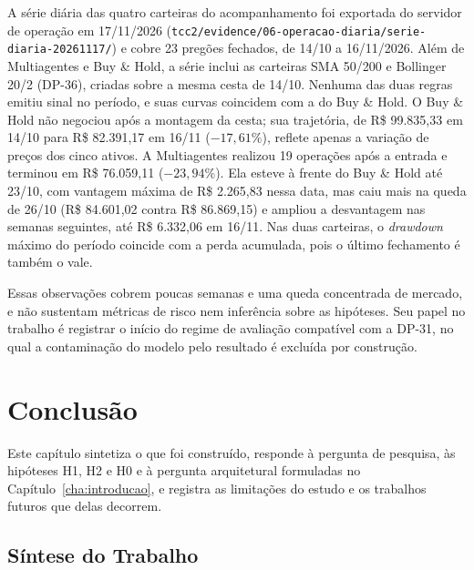\documentclass{eic-bcc-tcc}
\begin{document}
A série diária das quatro carteiras do acompanhamento foi exportada do servidor de operação em 17/11/2026 (\texttt{tcc2/evidence/06-operacao-diaria/serie-diaria-20261117/}) e cobre 23 pregões fechados, de 14/10 a 16/11/2026. Além de Multiagentes e Buy \& Hold, a série inclui as carteiras SMA 50/200 e Bollinger 20/2 (DP-36), criadas sobre a mesma cesta de 14/10. Nenhuma das duas regras emitiu sinal no período, e suas curvas coincidem com a do Buy \& Hold. O Buy \& Hold não negociou após a montagem da cesta; sua trajetória, de R\$ 99.835,33 em 14/10 para R\$ 82.391,17 em 16/11 ($-17{,}61\%$), reflete apenas a variação de preços dos cinco ativos. A Multiagentes realizou 19 operações após a entrada e terminou em R\$ 76.059,11 ($-23{,}94\%$). Ela esteve à frente do Buy \& Hold até 23/10, com vantagem máxima de R\$ 2.265,83 nessa data, mas caiu mais na queda de 26/10 (R\$ 84.601,02 contra R\$ 86.869,15) e ampliou a desvantagem nas semanas seguintes, até R\$ 6.332,06 em 16/11. Nas duas carteiras, o \textit{drawdown} máximo do período coincide com a perda acumulada, pois o último fechamento é também o vale.

Essas observações cobrem poucas semanas e uma queda concentrada de mercado, e não sustentam métricas de risco nem inferência sobre as hipóteses. Seu papel no trabalho é registrar o início do regime de avaliação compatível com a DP-31, no qual a contaminação do modelo pelo resultado é excluída por construção.

\chapter{Conclusão}
\label{cha:conclusao}

Este capítulo sintetiza o que foi construído, responde à pergunta de pesquisa, às hipóteses H1, H2 e H0 e à pergunta arquitetural formuladas no Capítulo~\ref{cha:introducao}, e registra as limitações do estudo e os trabalhos futuros que delas decorrem.

\section{Síntese do Trabalho}
\end{document}

